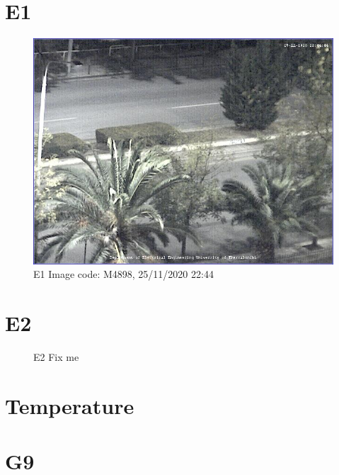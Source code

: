 \documentclass[hidelinks, 12pt, a4paper]{article}
\begin{document}
\section{E1}

\begin{figure}[h!]
\centering
	\includegraphics[height=.4\textheight, width=\textwidth]{assets/session1/image_fix.jpg}
	\caption{E1 Image code: M4898, 25/11/2020 22:44} 
\end{figure}

\section{E2}

\begin{figure}[h!]
\centering
	\caption{E2 Fix me} 
\end{figure}

\section{Temperature}



\section{G9}
\end{document}
